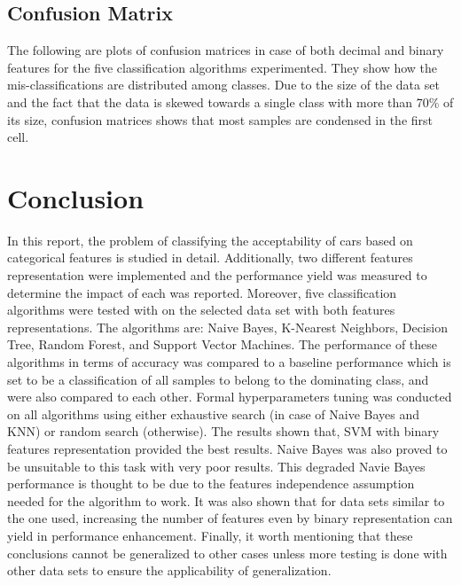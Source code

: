 \documentclass{article}
\begin{document}
\subsection{Confusion Matrix}
The following are plots of confusion matrices in case of both decimal and binary features for the five classification algorithms experimented. They show how the mis-classifications are distributed among classes. Due to the size of the data set and the fact that the data is skewed towards a single class with more than 70\% of its size, confusion matrices shows that most samples are condensed in the first cell.



\section{Conclusion}
In this report, the problem of classifying the acceptability of cars based on categorical features is studied in detail. Additionally, two different features representation were implemented and the performance yield was measured to determine the impact of each was reported. Moreover, five classification algorithms were tested with on the selected data set with both features representations. The algorithms are: Naive Bayes, K-Nearest Neighbors, Decision Tree, Random Forest, and Support Vector Machines. The performance of these algorithms in terms of accuracy was compared to a baseline performance which is set to be a classification of all samples to belong to the dominating class, and were also compared to each other. Formal hyperparameters tuning was conducted on all algorithms using either exhaustive search (in case of Naive Bayes and KNN) or random search (otherwise). The results shown that, SVM with binary features representation provided the best results. Naive Bayes was also proved to be unsuitable to this task with very poor results. This degraded Navie Bayes performance is thought to be due to the features independence assumption needed for the algorithm to work. It was also shown that for data sets similar to the one used, increasing the number of features even by binary representation can yield in performance enhancement. Finally, it worth mentioning that these conclusions cannot be generalized to other cases unless more testing is done with other data sets to ensure the applicability of generalization.

\end{document}
